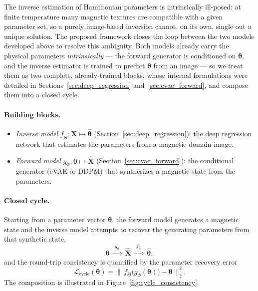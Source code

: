 \documentclass[letterpaper, 12, one column]{article}
\begin{document}
The inverse estimation of Hamiltonian parameters is intrinsically ill-posed: at finite temperature many magnetic textures are compatible with a given parameter set, so a purely image-based inversion cannot, on its own, single out a unique solution. The proposed framework closes the loop between the two models developed above to resolve this ambiguity. Both models already carry the physical parameters \emph{intrinsically} --- the forward generator is conditioned on $\boldsymbol{\theta}$, and the inverse estimator is trained to predict $\boldsymbol{\theta}$ from an image --- so we treat them as two complete, already-trained blocks, whose internal formulations were detailed in Sections~\ref{sec:deep_regression} and~\ref{sec:cvae_forward}, and compose them into a closed cycle.

\paragraph{Building blocks.}
\begin{itemize}
\item[--] \emph{Inverse model} $f_{\hat{\Theta}}:\mathbf{X}\mapsto\hat{\boldsymbol{\theta}}$ (Section~\ref{sec:deep_regression}): the deep regression network that estimates the parameters from a magnetic domain image.
\item[--] \emph{Forward model} $g_{\Phi}:\boldsymbol{\theta}\mapsto\hat{\mathbf{X}}$ (Section~\ref{sec:cvae_forward}): the conditional generator (cVAE or DDPM) that synthesizes a magnetic state from the parameters.
\end{itemize}

\paragraph{Closed cycle.}
Starting from a parameter vector $\boldsymbol{\theta}$, the forward model generates a magnetic state and the inverse model attempts to recover the generating parameters from that synthetic state,
\begin{equation}
\boldsymbol{\theta}\;\xrightarrow{\;g_{\Phi}\;}\;\hat{\mathbf{X}}\;\xrightarrow{\;f_{\hat{\Theta}}\;}\;\hat{\boldsymbol{\theta}},
\label{eq:cycle_flow}
\end{equation}
and the round-trip consistency is quantified by the parameter recovery error
\begin{equation}
\mathcal{L}_{\mathrm{cycle}}(\boldsymbol{\theta}) = \big\lVert\, f_{\hat{\Theta}}\big(g_{\Phi}(\boldsymbol{\theta})\big) - \boldsymbol{\theta}\,\big\rVert_2^2 .
\label{eq:cycle_consistency}
\end{equation}
The composition is illustrated in Figure~\ref{fig:cycle_consistency}.
\end{document}
